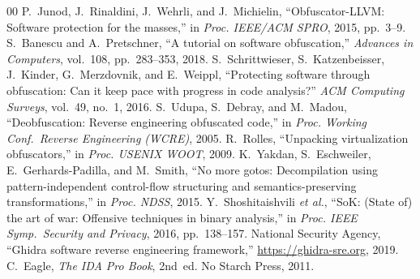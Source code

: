 \documentclass[conference]{IEEEtran}
\begin{document}
\begin{thebibliography}{00}
 P.~Junod, J.~Rinaldini, J.~Wehrli, and J.~Michielin, ``Obfuscator-LLVM: Software protection for the masses,'' in \emph{Proc. IEEE/ACM SPRO}, 2015, pp.~3--9.
 S.~Banescu and A.~Pretschner, ``A tutorial on software obfuscation,'' \emph{Advances in Computers}, vol.~108, pp.~283--353, 2018.
 S.~Schrittwieser, S.~Katzenbeisser, J.~Kinder, G.~Merzdovnik, and E.~Weippl, ``Protecting software through obfuscation: Can it keep pace with progress in code analysis?'' \emph{ACM Computing Surveys}, vol.~49, no.~1, 2016.
 S.~Udupa, S.~Debray, and M.~Madou, ``Deobfuscation: Reverse engineering obfuscated code,'' in \emph{Proc. Working Conf.\ Reverse Engineering (WCRE)}, 2005.
 R.~Rolles, ``Unpacking virtualization obfuscators,'' in \emph{Proc. USENIX WOOT}, 2009.
 K.~Yakdan, S.~Eschweiler, E.~Gerhards-Padilla, and M.~Smith, ``No more gotos: Decompilation using pattern-independent control-flow structuring and semantics-preserving transformations,'' in \emph{Proc. NDSS}, 2015.
 Y.~Shoshitaishvili \emph{et al.}, ``SoK: (State of) the art of war: Offensive techniques in binary analysis,'' in \emph{Proc. IEEE Symp.\ Security and Privacy}, 2016, pp.~138--157.
 National Security Agency, ``Ghidra software reverse engineering framework,'' \url{https://ghidra-sre.org}, 2019.
 C.~Eagle, \emph{The IDA Pro Book}, 2nd~ed. No Starch Press, 2011.
\end{thebibliography}
\end{document}
